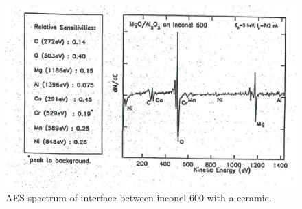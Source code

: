 \begin{enumerate}
\begin{figure}[h!]
	\begin{center}
	\includegraphics[scale=4]{figures/06_18.png}
	\caption{AES spectrum of interface between inconel 600 with a ceramic.}
	\label{fig:aesinconel}
	\end{center}
\end{figure}
\end{enumerate}